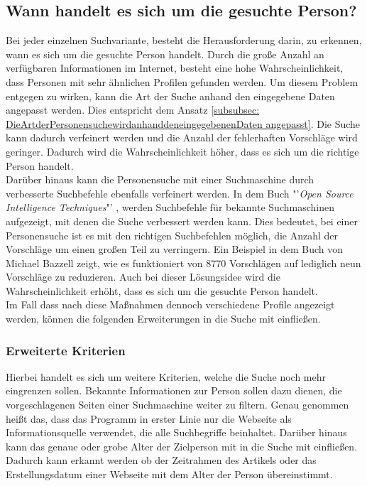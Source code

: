 	\subsection{Wann handelt es sich um die gesuchte Person?}
	\label{sec:WannhandeltessichumdiegesuchtePerson}
	Bei jeder einzelnen Suchvariante, besteht die Herausforderung darin, zu erkennen, wann es sich um die gesuchte Person handelt. Durch die große Anzahl an verfügbaren Informationen im Internet, besteht eine hohe Wahrscheinlichkeit, dass Personen mit sehr ähnlichen Profilen gefunden werden. Um diesem Problem entgegen zu wirken, kann die Art der Suche anhand den eingegebene Daten angepasst werden. Dies entspricht dem Ansatz \ref{subsubsec: DieArtderPersonensuchewirdanhanddeneingegebenenDaten angepasst}. Die Suche kann dadurch verfeinert werden und die Anzahl der fehlerhaften Vorschläge wird geringer. Dadurch wird die Wahrscheinlichkeit höher, dass es sich um die richtige Person handelt.\\
	Darüber hinaus kann die Personensuche mit einer Suchmaschine durch verbesserte Suchbefehle ebenfalls verfeinert werden. In dem Buch "'\textit{Open Source Intelligence Techniques}"' \cite{Bazzell}, werden Suchbefehle für bekannte Suchmaschinen aufgezeigt, mit denen die Suche verbessert werden kann. Dies bedeutet, bei einer Personensuche ist es mit den richtigen Suchbefehlen möglich, die Anzahl der Vorschläge um einen großen Teil zu verringern. Ein Beispiel in dem Buch von Michael Bazzell zeigt, wie es funktioniert von 8770 Vorschlägen auf lediglich neun Vorschläge zu reduzieren.\cite{Bazzell} Auch bei dieser Lösungsidee wird die Wahrscheinlichkeit erhöht, dass es sich um die gesuchte Person handelt.\\ Im Fall dass nach diese Maßnahmen dennoch verschiedene Profile angezeigt werden, können die folgenden Erweiterungen in die Suche mit einfließen.
		\subsubsection{Erweiterte Kriterien}
		\label{sec:ErweiterteKriteriern}
		Hierbei handelt es sich um weitere Kriterien, welche die Suche noch mehr eingrenzen sollen. Bekannte Informationen zur Person sollen dazu dienen, die vorgeschlagenen Seiten einer Suchmaschine weiter zu filtern. Genau genommen heißt das, dass das Programm in erster Linie nur die Webseite als Informationsquelle verwendet, die alle Suchbegriffe beinhaltet. Darüber hinaus kann das genaue oder grobe Alter der Zielperson mit in die Suche mit einfließen. Dadurch kann erkannt werden ob der Zeitrahmen des Artikels oder das Erstellungsdatum einer Webseite mit dem Alter der Person übereinstimmt.
